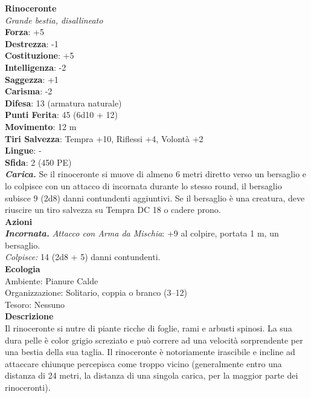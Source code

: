 \begin{multicols}{2}
\medskip\textbf{Rinoceronte}\\
\emph{Grande bestia, disallineato}\\
\textbf{Forza}: +5\\
\textbf{Destrezza}: -1\\
\textbf{Costituzione}: +5\\
\textbf{Intelligenza}: -2\\
\textbf{Saggezza}: +1\\
\textbf{Carisma}: -2\\
\textbf{Difesa}: 13 (armatura naturale)\\
\textbf{Punti Ferita}: 45 (6d10 + 12)\\
\textbf{Movimento}: 12 m\\
\textbf{Tiri Salvezza}: Tempra +10, Riflessi +4, Volontà +2\\
\textbf{Lingue}: -\\
\textbf{Sfida}: 2 (450 PE)\smallskip\\
\emph{\textbf{Carica.}} Se il rinoceronte si muove di almeno 6 metri diretto verso un bersaglio e lo colpisce con un attacco di incornata durante lo stesso round, il bersaglio subisce 9 (2d8) danni contundenti aggiuntivi. Se il bersaglio è una creatura, deve riuscire un tiro salvezza su Tempra DC  18 o cadere prono.\\
\smallskip\textbf{Azioni}\\
\emph{\textbf{Incornata.} Attacco con Arma da Mischia}: +9 al colpire, portata 1 m, un bersaglio.\\
\emph{Colpisce:} 14 (2d8 + 5) danni contundenti.\\
\textbf{Ecologia}\\
Ambiente: Pianure Calde\\
Organizzazione: Solitario, coppia o branco (3–12)\\
Tesoro: Nessuno\\
\textbf{Descrizione}\\

Il rinoceronte si nutre di piante ricche di foglie, rami e arbusti spinosi. La sua dura pelle è color grigio screziato e può correre ad una velocità sorprendente per una bestia della sua taglia. Il rinoceronte è notoriamente irascibile e incline ad attaccare chiunque percepisca come troppo vicino (generalmente entro una distanza di 24 metri, la distanza di una singola carica, per la maggior parte dei rinoceronti). \\


\end{multicols}
